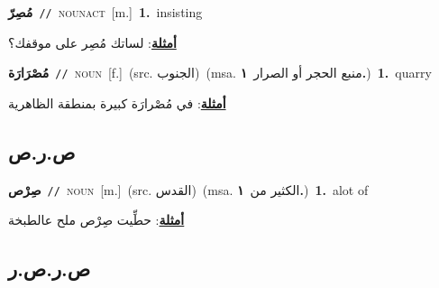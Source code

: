 \documentclass[10pt,a4paper,twoside]{article} %
\begin{document}
\begin{multicols}{2}
{\setlength\topsep{0pt}\textbf{\foreignlanguage{arabic}{مُصِرّ}}\ {\color{gray}\texttt{//}\color{black}}\ \textsc{noun\textunderscore act}\ [m.]\ \textbf{1.}~insisting\  \begin{flushright}\color{gray}\foreignlanguage{arabic}{\textbf{\underline{\foreignlanguage{arabic}{أمثلة}}}: لساتك مُصِر على موقفك؟}\end{flushright}\color{black}} \vspace{2mm}

{\setlength\topsep{0pt}\textbf{\foreignlanguage{arabic}{مُصْرَارَة}}\ {\color{gray}\texttt{//}\color{black}}\ \textsc{noun}\ [f.]\ (src. \color{gray}\foreignlanguage{arabic}{الجنوب}\color{black})\ \color{gray}(msa. \foreignlanguage{arabic}{منبع الحجر أو الصرار}~\foreignlanguage{arabic}{\textbf{١.}})\color{black}\ \textbf{1.}~quarry\  \begin{flushright}\color{gray}\foreignlanguage{arabic}{\textbf{\underline{\foreignlanguage{arabic}{أمثلة}}}: في مُصْرارَة كبيرة بمنطقة الظاهرية}\end{flushright}\color{black}} \vspace{2mm}

\vspace{-3mm}
\subsection*{\color{blue}\foreignlanguage{arabic}{ص.ر.ص}\color{blue}{ (ntws)}} 

{\setlength\topsep{0pt}\textbf{\foreignlanguage{arabic}{صِرْص}}\ {\color{gray}\texttt{//}\color{black}}\ \textsc{noun}\ [m.]\ (src. \color{gray}\foreignlanguage{arabic}{القدس}\color{black})\ \color{gray}(msa. \foreignlanguage{arabic}{الكثير من}~\foreignlanguage{arabic}{\textbf{١.}})\color{black}\ \textbf{1.}~alot of\  \begin{flushright}\color{gray}\foreignlanguage{arabic}{\textbf{\underline{\foreignlanguage{arabic}{أمثلة}}}: حطِّيت صِرْص ملح عالطبخة}\end{flushright}\color{black}} \vspace{2mm}

\vspace{-3mm}
\subsection*{\color{blue}\foreignlanguage{arabic}{ص.ر.ص.ر}\color{blue}{}} 


\end{multicols}
\end{document}
